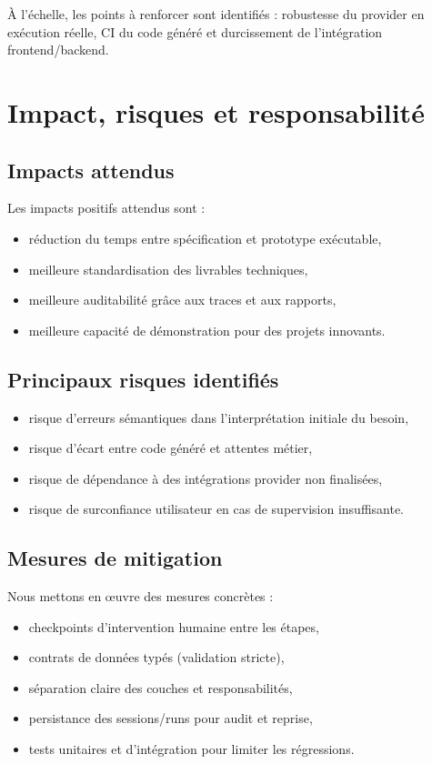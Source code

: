 \documentclass[11pt,a4paper]{article}
\begin{document}
À l'échelle, les points à renforcer sont identifiés : robustesse du provider en exécution réelle, CI du code généré et durcissement de l'intégration frontend/backend.

\section{Impact, risques et responsabilité}
\subsection*{Impacts attendus}
Les impacts positifs attendus sont :
\begin{itemize}
  \item réduction du temps entre spécification et prototype exécutable,
  \item meilleure standardisation des livrables techniques,
  \item meilleure auditabilité grâce aux traces et aux rapports,
  \item meilleure capacité de démonstration pour des projets innovants.
\end{itemize}

\subsection*{Principaux risques identifiés}
\begin{itemize}
  \item risque d'erreurs sémantiques dans l'interprétation initiale du besoin,
  \item risque d'écart entre code généré et attentes métier,
  \item risque de dépendance à des intégrations provider non finalisées,
  \item risque de surconfiance utilisateur en cas de supervision insuffisante.
\end{itemize}

\subsection*{Mesures de mitigation}
Nous mettons en œuvre des mesures concrètes :
\begin{itemize}
  \item checkpoints d'intervention humaine entre les étapes,
  \item contrats de données typés (validation stricte),
  \item séparation claire des couches et responsabilités,
  \item persistance des sessions/runs pour audit et reprise,
  \item tests unitaires et d'intégration pour limiter les régressions.
\end{itemize}
\end{document}
